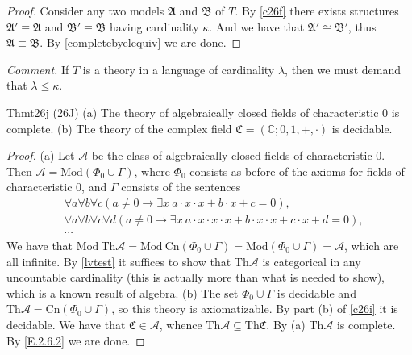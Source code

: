 \begin{proof}
  Consider any two models $\mathfrak{A}$ and $\mathfrak{B}$ of $T$. By \ref{c26f} there exists structures $\mathfrak{A}'\equiv \mathfrak{A}$ and $\mathfrak{B}'\equiv \mathfrak{B}$ having cardinality $\kappa$. And we have that $\mathfrak{A}'\cong \mathfrak{B}'$, thus $\mathfrak{A}\equiv \mathfrak{B}$. By \ref{completebyelequiv} we are done.
\end{proof}

\textit{Comment.} If $T$ is a theory in a language of cardinality $\lambda$, then we must demand that $\lambda\leq \kappa$.

\begin{reference}{Thm}{t26j}
  (26J) (a) The theory of algebraically closed fields of characteristic 0 is complete. (b) The theory of the complex field $\mathfrak{C}=(\mathbb{C};0,1,+,\cdot)$ is decidable.
\end{reference}

\begin{proof}
  (a) Let $\mathcal{A}$ be the class of algebraically closed fields of characteristic 0. Then $\mathcal{A}=\mathrm{Mod}(\Phi_0\cup \Gamma)$, where $\Phi_0$ consists as before of the axioms for fields of characteristic 0, and $\Gamma$ consists of the sentences
  \begin{align*}
     & \forall a\forall b\forall c(a\neq 0\to \exists x\ a\cdot x\cdot x+b\cdot x+c=0),                                  \\
     & \forall a\forall b\forall c\forall d(a\neq 0\to \exists x\ a\cdot x\cdot x\cdot x+b\cdot x\cdot x+c\cdot x+ d=0), \\
     & \cdots
  \end{align*}
  We have that $\mathrm{Mod\ Th}\mathcal{A}=\mathrm{Mod\ Cn}(\Phi_0\cup \Gamma)=\mathrm{Mod}(\Phi_0\cup \Gamma)=\mathcal{A}$, which are all infinite. By \ref{lvtest} it suffices to show that $\mathrm{Th}\mathcal{A}$ is categorical in any uncountable cardinality (this is actually more than what is needed to show), which is a known result of algebra. (b) The set $\Phi_0\cup \Gamma$ is decidable and $\mathrm{Th}\mathcal{A}=\mathrm{Cn}(\Phi_0\cup \Gamma)$, so this theory is axiomatizable. By part (b) of \ref{c26i} it is decidable. We have that $\mathfrak{C}\in \mathcal{A}$, whence $\mathrm{Th}\mathcal{A}\subseteq \mathrm{Th}\mathfrak{C}$. By (a) $\mathrm{Th}\mathcal{A}$ is complete. By \ref{E.2.6.2} we are done.
\end{proof}


